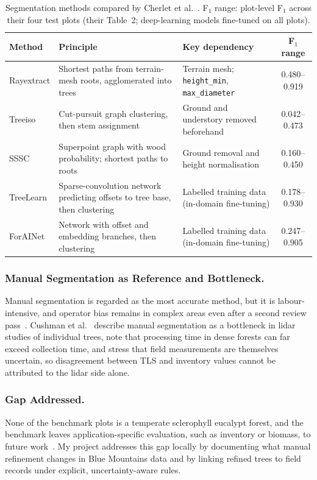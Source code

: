 \documentclass[runningheads]{llncs}
\begin{document}
\begin{table}[!tb]
\caption{Segmentation methods compared by Cherlet et al.~\cite{cherlet2026}. F$_1$ range: plot-level F$_1$ across their four test plots (their Table~2; deep-learning models fine-tuned on all plots).}\label{tab:methods}
\centering\footnotesize
\begin{tabular}{@{}L{1.45cm}L{4.0cm}L{3.6cm}c@{}}
\toprule
Method & Principle & Key dependency & F$_1$ range\\
\midrule
Rayextract & Shortest paths from terrain-mesh roots, agglomerated into trees & Terrain mesh; \texttt{height\_min}, \texttt{max\_diameter} & 0.480--0.919\\
Treeiso & Cut-pursuit graph clustering, then stem assignment & Ground and understory removed beforehand & 0.042--0.473\\
SSSC & Superpoint graph with wood probability; shortest paths to roots & Ground removal and height normalisation & 0.160--0.450\\
TreeLearn & Sparse-convolution network predicting offsets to tree base, then clustering & Labelled training data (in-domain fine-tuning) & 0.178--0.930\\
ForAINet & Network with offset and embedding branches, then clustering & Labelled training data (in-domain fine-tuning) & 0.247--0.905\\
\bottomrule
\end{tabular}
\end{table}

\subsubsection{Manual Segmentation as Reference and Bottleneck.}
Manual segmentation is regarded as the most accurate method, but it is labour-intensive, and operator bias remains in complex areas even after a second review pass~\cite{cherlet2026}. Cushman et al.~\cite{cushman2026} describe manual segmentation as a bottleneck in lidar studies of individual trees, note that processing time in dense forests can far exceed collection time, and stress that field measurements are themselves uncertain, so disagreement between TLS and inventory values cannot be attributed to the lidar side alone.

\subsubsection{Gap Addressed.}
None of the benchmark plots is a temperate sclerophyll eucalypt forest, and the benchmark leaves application-specific evaluation, such as inventory or biomass, to future work~\cite{cherlet2026}. My project addresses this gap locally by documenting what manual refinement changes in Blue Mountains data and by linking refined trees to field records under explicit, uncertainty-aware rules.
\end{document}
